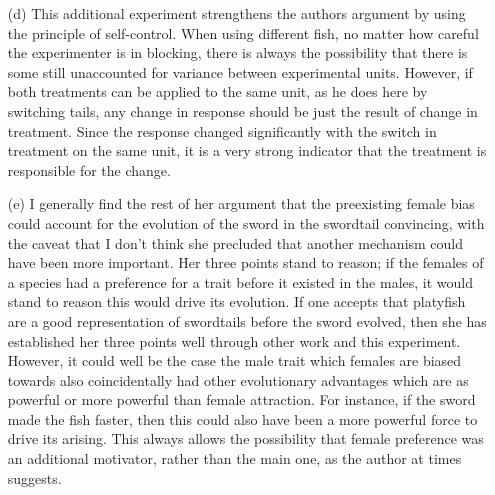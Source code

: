 \documentclass[11pt]{article}
\theoremstyle{definition}
\begin{document}
\begin{itemize}
\begin{itemize}
            \item[(d)] This additional experiment strengthens the authors argument by using the principle of self-control. When using different fish, no matter how careful the experimenter is in blocking, there is always the possibility that there is some still unaccounted for variance between experimental units. However, if both treatments can be applied to the same unit, as he does here by switching tails, any change in response should be just the result of change in treatment. Since the response changed significantly with the switch in treatment on the same unit, it is a very strong indicator that the treatment is responsible for the change.
            \item[(e)] I generally find the rest of her argument that the preexisting female bias could account for the evolution of the sword in the swordtail convincing, with the caveat that I don't think she precluded that another mechanism could have been more important. Her three points stand to reason; if the females of a species had a preference for a trait before it existed in the males, it would stand to reason this would drive its evolution. If one accepts that platyfish are a good representation of swordtails before the sword evolved, then she has established her three points well through other work and this experiment. However, it could well be the case the male trait which females are biased towards also coincidentally had other evolutionary advantages which are as powerful or more powerful than female attraction. For instance, if the sword made the fish faster, then this could also have been a more powerful force to drive its arising. This always allows the possibility that female preference was an additional motivator, rather than the main one, as the author at times suggests. 
    \end{itemize}
    

\end{itemize}
\end{document}
